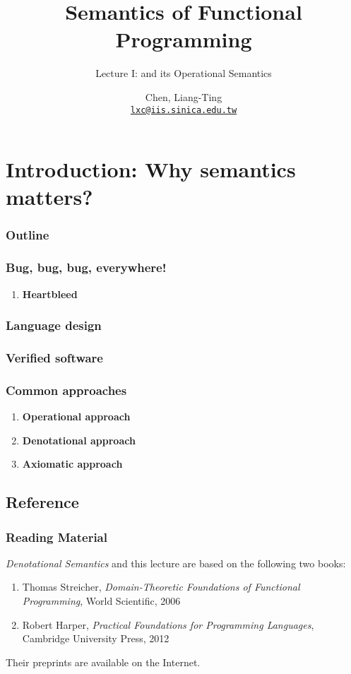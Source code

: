 \title{Semantics of Functional Programming}
\subtitle{Lecture I: \PCF{} and its Operational Semantics}
\author[L.-T. Chen]{Chen, Liang-Ting\\
  \href{mailto:lxc@iis.sinica.edu.tw}{\texttt{lxc@iis.sinica.edu.tw}}}

\frame{\maketitle}
\frame{\tableofcontents}
\section{Introduction: Why semantics matters?}  
\begin{frame}
  \frametitle{Outline}
\end{frame}
\begin{frame}
  \frametitle{Bug, bug, bug, everywhere!}
  \begin{enumerate}
    \item \textbf{Heartbleed}
  \end{enumerate}
\end{frame}
\begin{frame}
  \frametitle{Language design}
\end{frame}
\begin{frame}
  \frametitle{Verified software}
\end{frame}
\begin{frame}
  \frametitle{Common approaches}
  \begin{enumerate}
    \item \textbf{Operational approach}
    \item \textbf{Denotational approach}
    \item \textbf{Axiomatic approach}
  \end{enumerate}
\end{frame}
\subsection*{Reference}
\begin{frame}
  \frametitle{Reading Material}
  \emph{Denotational Semantics} and this lecture are based on the following 
  two books:
  \begin{enumerate}
    \item Thomas Streicher, \emph{Domain-Theoretic Foundations of Functional
      Programming}, World Scientific, 2006
    \item Robert Harper, \emph{Practical Foundations for Programming
        Languages}, Cambridge University Press, 2012
  \end{enumerate}
  Their preprints are available on the Internet.
\end{frame}
